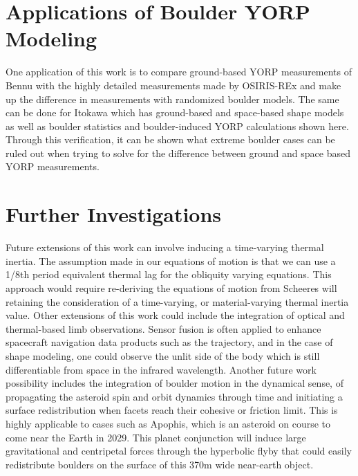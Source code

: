 \section{Applications of Boulder YORP Modeling}
One application of this work is to compare ground-based YORP measurements of Bennu with the highly detailed measurements made by OSIRIS-REx and make up the difference in measurements with randomized boulder models. The same can be done for Itokawa which has ground-based and space-based shape models as well as boulder statistics and boulder-induced YORP calculations shown here. Through this verification, it can be shown what extreme boulder cases can be ruled out when trying to solve for the difference between ground and space based YORP measurements. 

\section{Further Investigations}
Future extensions of this work can involve inducing a time-varying thermal inertia. The assumption made in our equations of motion is that we can use a 1/8th period equivalent thermal lag for the obliquity varying equations. This approach would require re-deriving the equations of motion from Scheeres will retaining the consideration of a time-varying, or material-varying thermal inertia value.
Other extensions of this work could include the integration of optical and thermal-based limb observations. Sensor fusion is often applied to enhance spacecraft navigation data products such as the trajectory, and in the case of shape modeling, one could observe the unlit side of the body which is still differentiable from space in the infrared wavelength.
Another future work possibility includes the integration of boulder motion in the dynamical sense, of propagating the asteroid spin and orbit dynamics through time and initiating a surface redistribution when facets reach their cohesive or friction limit. This is highly applicable to cases such as Apophis, which is an asteroid on course to come near the Earth in 2029. This planet conjunction will induce large gravitational and centripetal forces through the hyperbolic flyby that could easily redistribute boulders on the surface of this 370m wide near-earth object.
